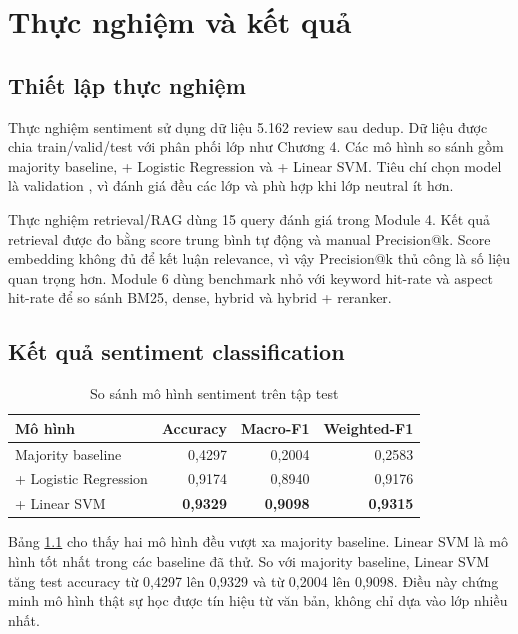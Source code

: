 \chapter{Thực nghiệm và kết quả}
\section{Thiết lập thực nghiệm}
Thực nghiệm sentiment sử dụng dữ liệu 5.162 review sau dedup. Dữ liệu được chia train/valid/test với phân phối lớp như Chương 4. Các mô hình so sánh gồm majority baseline, \TFIDF{} + Logistic Regression và \TFIDF{} + Linear SVM. Tiêu chí chọn model là validation \MacroFOne{}, vì \MacroFOne{} đánh giá đều các lớp và phù hợp khi lớp neutral ít hơn.

Thực nghiệm retrieval/RAG dùng 15 query đánh giá trong Module 4. Kết quả retrieval được đo bằng score trung bình tự động và manual Precision@k. Score embedding không đủ để kết luận relevance, vì vậy Precision@k thủ công là số liệu quan trọng hơn. Module 6 dùng benchmark nhỏ với keyword hit-rate và aspect hit-rate để so sánh BM25, dense, hybrid và hybrid + reranker.

\section{Kết quả sentiment classification}
\begin{table}[H]\centering\caption{So sánh mô hình sentiment trên tập test}\label{tab:sentiment-model-comparison}\begin{tabular}{lrrr}\toprule Mô hình & Accuracy & Macro-F1 & Weighted-F1 \\\midrule Majority baseline & 0,4297 & 0,2004 & 0,2583 \\ \TFIDF{} + Logistic Regression & 0,9174 & 0,8940 & 0,9176 \\ \TFIDF{} + Linear SVM & \textbf{0,9329} & \textbf{0,9098} & \textbf{0,9315} \\\bottomrule\end{tabular}\end{table}

Bảng \ref{tab:sentiment-model-comparison} cho thấy hai mô hình \TFIDF{} đều vượt xa majority baseline. Linear SVM là mô hình tốt nhất trong các baseline đã thử. So với majority baseline, Linear SVM tăng test accuracy từ 0,4297 lên 0,9329 và \MacroFOne{} từ 0,2004 lên 0,9098. Điều này chứng minh mô hình thật sự học được tín hiệu từ văn bản, không chỉ dựa vào lớp nhiều nhất.


